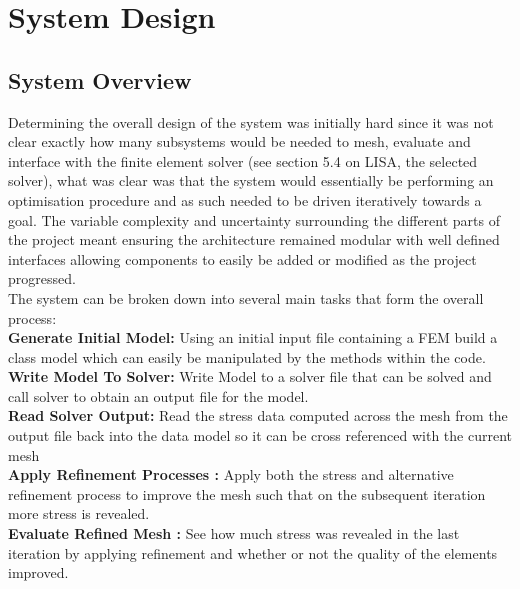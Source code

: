 \section{System Design}

\subsection{System Overview}
Determining the overall design of the system was initially hard since it was not clear exactly how many subsystems would be needed to mesh, evaluate and interface with the finite element solver (see section 5.4 on LISA, the selected solver), what was clear was that the system would essentially be performing an optimisation procedure and as such needed to be driven iteratively towards a goal. The variable complexity and uncertainty surrounding the different parts of the project meant ensuring the architecture remained modular with well defined interfaces allowing components to easily be added or modified as the project progressed. \\ 

\noindent
The system can be broken down into several main tasks that form the overall process: \\ 

\noindent
\textbf{Generate Initial Model: } Using an initial input file containing a FEM build a class model which can easily be manipulated by the methods within the code. \\ 

\noindent
\textbf{Write Model To Solver: } Write Model to a solver file that can be solved and call solver to obtain an output file for the model.  \\ 

\noindent
\textbf{Read Solver Output: } Read the stress data computed across the mesh from the output file back into the data model so it can be cross referenced with the current mesh \\ 

\noindent
\textbf{Apply Refinement Processes : } Apply both the stress and alternative refinement process to improve the mesh such that on the subsequent iteration more stress is revealed. \\ 

\noindent
\textbf{Evaluate Refined Mesh : } See how much stress was revealed in the last iteration by applying refinement and whether or not the quality of the elements improved.



